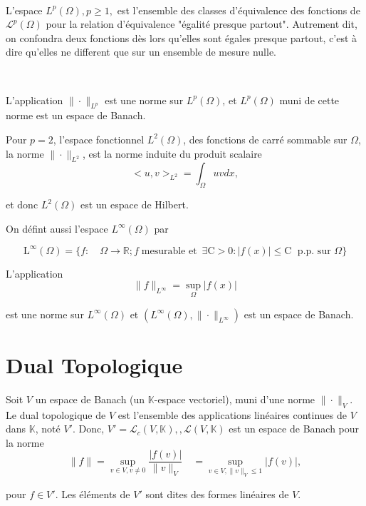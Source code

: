 \begin{definition}\
	
L'espace  $L^{p}(\Omega), p\geq 1,$ est l'ensemble des classes d'équivalence des fonctions de $\mathcal{L}^{p}(\Omega)$ pour la relation d'équivalence "égalité presque partout". Autrement dit, on confondra deux fonctions dès lors qu'elles sont égales presque partout, c'est à dire qu'elles ne different que sur un ensemble de mesure nulle.

\end{definition}

\begin{theorem}\
	
L'application  $\|\cdot \|_{L^p}$ est une norme sur $L^{p}(\Omega)$, et $L^{p}(\Omega)$ muni de cette  norme  est un espace de Banach.

Pour  $p=2$,   l'espace fonctionnel $L^{2}(\Omega)$,  des fonctions de carré sommable sur $\Omega$, la norme $\|\cdot \|_{L^{2}}$, est la norme induite  du produit scalaire $$<u, v>_{L^{2}}=\int_{\Omega} u v dx,
$$

 et donc   $L^{2}(\Omega)$ est un espace de Hilbert.
 
 On défint aussi l'espace $L^\infty(\Omega)$ par 
 
 $$
 \mathrm{L}^{\infty}(\Omega)=\{f: \quad \Omega \rightarrow \mathbb{R} ; f \; \text{mesurable et } \, \exists  \mathrm{C}>0 :  |f(x)| \leq \mathrm{C} \; \text{ p.p. sur } \Omega\}
 $$
 
 L'application 
 $$
 \|f\|_{L^{\infty}}= \sup_{\Omega} |f(x)|
 $$

est une norme sur $L^\infty(\Omega)$ et  $(L^\infty(\Omega), \|\cdot \|_{L^{\infty}})$ est un espace de Banach.

\end{theorem}

\section{Dual Topologique}

Soit $V$ un espace de Banach (un $\mathbb{K}$-espace vectoriel),  muni d'une norme $\|\cdot \|_V$.  Le dual topologique de $V$ est l'ensemble des applications linéaires continues de $V$ dans $\mathbb{K}$,  noté $V'$. Donc, $V'=\mathcal{L}_c(V,\mathbb{K}),, \mathcal{L}(V,\mathbb{K})$ est un espace de Banach pour la norme 
$$
\displaystyle\|f \|=\sup_{v\in V,v\neq0}\frac{|f(v) |}{\|v\|_V} \quad = \sup_{v\in V,\|v\|_V\leq 1}|f(v) |, 
$$  

pour $f\in V'$.  Les éléments de $V'$ sont dites des formes linéaires de $V$. 

